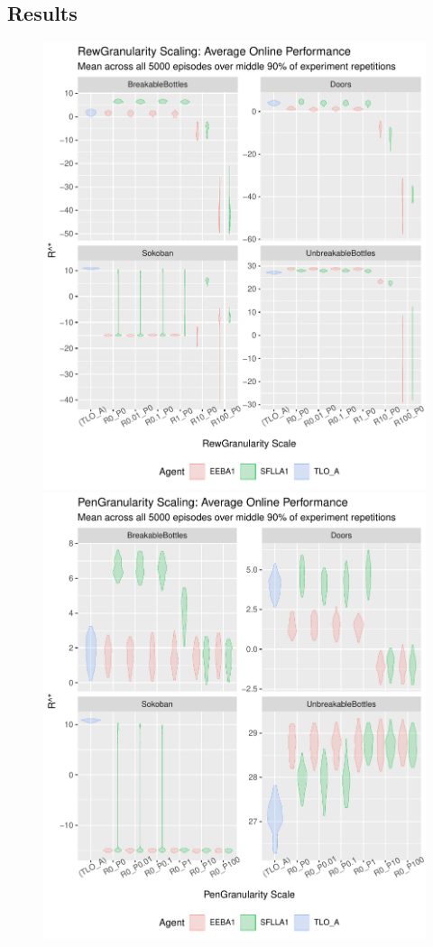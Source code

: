 \subsection{Results}

\begin{figure}
  \includegraphics[width=\columnwidth]{output/multirun_n100_pilot_granularityonline_RewGranularity.pdf}
  \includegraphics[width=\columnwidth]{output/multirun_n100_pilot_granularityonline_PenGranularity.pdf}

\end{figure}
